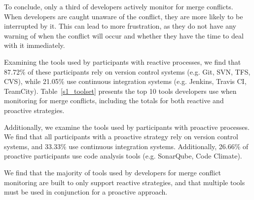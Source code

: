 To conclude, only a third of developers actively monitor for merge conflicts.
When developers are caught unaware of the conflict, they are more likely to be interrupted by it.
This can lead to more frustration, as they do not have any warning of when the conflict will occur and whether they have the time to deal with it immediately.


Examining the tools used by participants with reactive processes, we find that 87.72\% of these participants rely on version control systems (e.g. Git, SVN, TFS, CVS), while 21.05\% use continuous integration systems (e.g. Jenkins, Travis CI, TeamCity).
Table~\ref{s1_toolset} presents the top 10 tools developers use when monitoring for merge conflicts, including the totals for both reactive and proactive strategies.

Additionally, we examine the tools used by participants with proactive processes.
We find that all participants with a proactive strategy rely on version control systems, and 33.33\% use continuous integration systems.
Additionally, 26.66\% of proactive participants use code analysis tools (e.g. SonarQube, Code Climate).

We find that the majority of tools used by developers for merge conflict monitoring are built to only support reactive strategies, and that multiple tools must be used in conjunction for a proactive approach.


